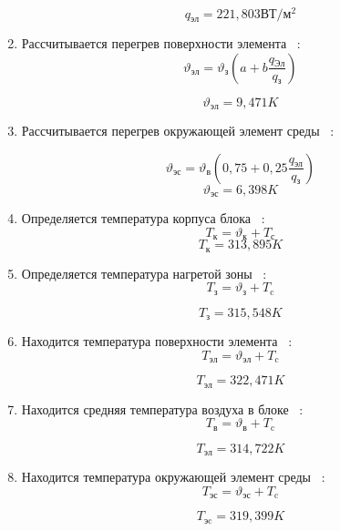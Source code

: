 \begin{enumerate}[label={\arabic*.}]
        $$q\mathrm{_{эл}} =221,803\mathrm{ВТ/м^2} $$

 \item Рассчитывается перегрев поверхности элемента ~\cite{Rotkop1976}:
 \begin{equation}
\vartheta\mathrm{_{эл}} = \vartheta\mathrm{_{з}}(a + b \frac{q\mathrm{_{Эл}}}{q\mathrm{_{з}}})
\end{equation}

$$\vartheta\mathrm{_{эл}} =9,471K$$

\item Рассчитывается перегрев окружающей элемент среды ~\cite{Rotkop1976}:

      \begin{equation}
      \vartheta\mathrm{_{эс}} = \vartheta\mathrm{_в}(0,75 + 0,25\frac{q\mathrm{_{эл}}}{q\mathrm{_{з}}})
    \end{equation}
    $$\vartheta\mathrm{_{эс}} = 6,398K$$

  \item Определяется температура корпуса блока ~\cite{Rotkop1976}:
    \begin{equation}
      T\mathrm{_к} = \vartheta\mathrm{_{к}} + T\mathrm{_с}
    \end{equation}
    $$T\mathrm{_{к}} = 313,895 K$$
    
\item Определяется температура нагретой зоны ~\cite{Rotkop1976}:
    \begin{equation}
      T\mathrm{_з} = \vartheta\mathrm{_з} + T\mathrm{_c}
    \end{equation}

    $$T\mathrm{_з} = 315,548 K$$
  \item Находится температура поверхности элемента ~\cite{Rotkop1976}:
    \begin{equation}
      T\mathrm{_{эл}} = \vartheta\mathrm{_{эл}} + T\mathrm{_c}
    \end{equation}

    $$T\mathrm{_{эл}} = 322,471 K$$

  \item Находится средняя температура воздуха в блоке ~\cite{Rotkop1976}:
    \begin{equation}
      T\mathrm{_{в}} = \vartheta\mathrm{_{в}} + T\mathrm{_c}
    \end{equation}

    $$T\mathrm{_{эл}} = 314,722 K$$

  \item Находится температура окружающей элемент среды ~\cite{Rotkop1976}:
    \begin{equation}
      T\mathrm{_{эс}} = \vartheta\mathrm{_{эс}} + T\mathrm{_c}
    \end{equation}

    $$T\mathrm{_{эc}} = 319,399 K$$
\end{enumerate}
 